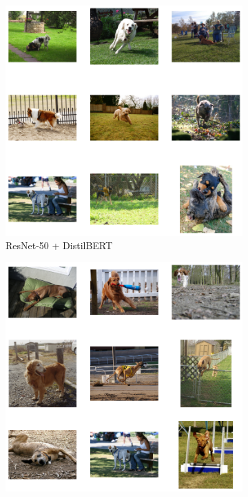 \documentclass[11pt]{article}
\begin{document}
\begin{figure}[H]
    \centering
    \begin{subfigure}[b]{0.3\textwidth}
        \includegraphics[width=\linewidth]{Q2/A dog sitting alone in a park/1.png}
        \caption{\tiny ResNet-50 + DistilBERT}
    \end{subfigure}
    \hfill
    \begin{subfigure}[b]{0.3\textwidth}
        \includegraphics[width=\linewidth]{Q2/A dog sitting alone in a park/2.png}

\end{subfigure}
\end{figure}
\end{document}
